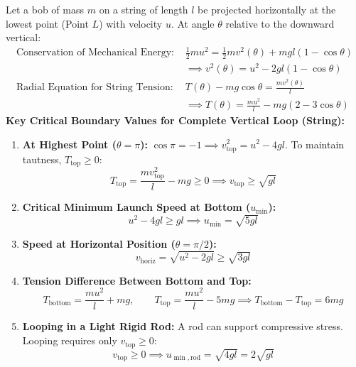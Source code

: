 \documentclass[10pt,twoside,openright]{book}
\begin{document}
\begin{formulabox}
Let a bob of mass $m$ on a string of length $l$ be projected horizontally at the lowest point (Point $L$) with velocity $u$.
At angle $\theta$ relative to the downward vertical:
\begin{align}
  \text{Conservation of Mechanical Energy: } &\frac{1}{2}mu^2 = \frac{1}{2}mv^2(\theta) + mgl(1 - \cos\theta) \nonumber \\
  &\implies v^2(\theta) = u^2 - 2gl(1 - \cos\theta) \\
  \text{Radial Equation for String Tension: } &T(\theta) - mg\cos\theta = \frac{mv^2(\theta)}{l} \nonumber \\
  &\implies T(\theta) = \frac{mu^2}{l} - mg(2 - 3\cos\theta)
\end{align}
\textbf{Key Critical Boundary Values for Complete Vertical Loop (String):}
\begin{enumerate}[leftmargin=*]
  \item \textbf{At Highest Point ($\theta = \pi$):} $\cos\pi = -1 \implies v_{\text{top}}^2 = u^2 - 4gl$.
  To maintain tautness, $T_{\text{top}} \ge 0$:
  \begin{equation}
    T_{\text{top}} = \frac{m v_{\text{top}}^2}{l} - mg \ge 0 \implies v_{\text{top}} \ge \sqrt{gl}
  \end{equation}
  \item \textbf{Critical Minimum Launch Speed at Bottom ($u_{\min}$):}
  \begin{equation}
    u^2 - 4gl \ge gl \implies u_{\min} = \sqrt{5gl}
  \end{equation}
  \item \textbf{Speed at Horizontal Position ($\theta = \pi/2$):}
  \begin{equation}
    v_{\text{horiz}} = \sqrt{u^2 - 2gl} \ge \sqrt{3gl}
  \end{equation}
  \item \textbf{Tension Difference Between Bottom and Top:}
  \begin{equation}
    T_{\text{bottom}} = \frac{mu^2}{l} + mg, \qquad T_{\text{top}} = \frac{mu^2}{l} - 5mg \implies T_{\text{bottom}} - T_{\text{top}} = 6mg
  \end{equation}
  \item \textbf{Looping in a Light Rigid Rod:} A rod can support compressive stress. Looping requires only $v_{\text{top}} \ge 0$:
  \begin{equation}
    v_{\text{top}} \ge 0 \implies u_{\min,\text{rod}} = \sqrt{4gl} = 2\sqrt{gl}
  \end{equation}
\end{enumerate}
\end{formulabox}
\end{document}
